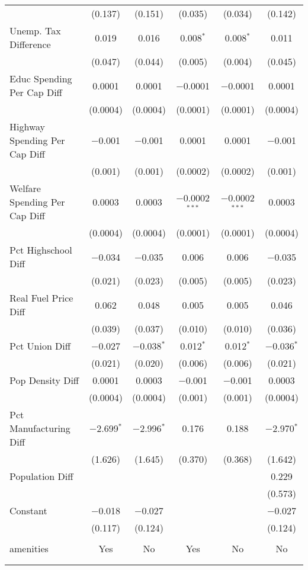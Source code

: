 \begin{table}[!htbp]
\begin{tabular}{@{\extracolsep{5pt}}lccccc}
  & (0.137) & (0.151) & (0.035) & (0.034) & (0.142) \\ 
  Unemp. Tax Difference & 0.019 & 0.016 & 0.008$^{*}$ & 0.008$^{*}$ & 0.011 \\ 
  & (0.047) & (0.044) & (0.005) & (0.004) & (0.045) \\ 
  Educ Spending Per Cap Diff & 0.0001 & 0.0001 & $-$0.0001 & $-$0.0001 & 0.0001 \\ 
  & (0.0004) & (0.0004) & (0.0001) & (0.0001) & (0.0004) \\ 
  Highway Spending Per Cap Diff & $-$0.001 & $-$0.001 & 0.0001 & 0.0001 & $-$0.001 \\ 
  & (0.001) & (0.001) & (0.0002) & (0.0002) & (0.001) \\ 
  Welfare Spending Per Cap Diff & 0.0003 & 0.0003 & $-$0.0002$^{***}$ & $-$0.0002$^{***}$ & 0.0003 \\ 
  & (0.0004) & (0.0004) & (0.0001) & (0.0001) & (0.0004) \\ 
  Pct Highschool Diff & $-$0.034 & $-$0.035 & 0.006 & 0.006 & $-$0.035 \\ 
  & (0.021) & (0.023) & (0.005) & (0.005) & (0.023) \\ 
  Real Fuel Price Diff & 0.062 & 0.048 & 0.005 & 0.005 & 0.046 \\ 
  & (0.039) & (0.037) & (0.010) & (0.010) & (0.036) \\ 
  Pct Union Diff & $-$0.027 & $-$0.038$^{*}$ & 0.012$^{*}$ & 0.012$^{*}$ & $-$0.036$^{*}$ \\ 
  & (0.021) & (0.020) & (0.006) & (0.006) & (0.021) \\ 
  Pop Density Diff & 0.0001 & 0.0003 & $-$0.001 & $-$0.001 & 0.0003 \\ 
  & (0.0004) & (0.0004) & (0.001) & (0.001) & (0.0004) \\ 
  Pct Manufacturing Diff & $-$2.699$^{*}$ & $-$2.996$^{*}$ & 0.176 & 0.188 & $-$2.970$^{*}$ \\ 
  & (1.626) & (1.645) & (0.370) & (0.368) & (1.642) \\ 
  Population Diff &  &  &  &  & 0.229 \\ 
  &  &  &  &  & (0.573) \\ 
  Constant & $-$0.018 & $-$0.027 &  &  & $-$0.027 \\ 
  & (0.117) & (0.124) &  &  & (0.124) \\ 
 \hline \\[-1.8ex] 
amenities & Yes & No & Yes & No & No \\ 
\hline \\[-1.8ex] 
\hline 
\hline \\[-1.8ex] 
\end{tabular} 
\end{table} 
